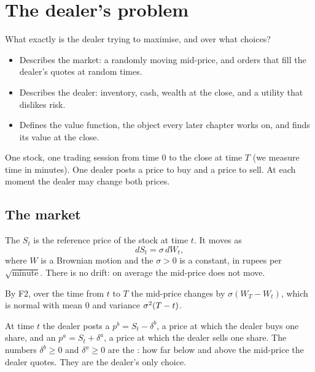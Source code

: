 \chapter{The dealer's problem}
\label{ch:problem}

\begin{question}
What exactly is the dealer trying to maximise, and over what choices?
\end{question}

\begin{whatfor}
\begin{itemize}
  \item Describes the market: a randomly moving mid-price, and orders that fill the dealer's quotes at random times.
  \item Describes the dealer: inventory, cash, wealth at the close, and a utility that dislikes risk.
  \item Defines the value function, the object every later chapter works on, and finds its value at the close.
\end{itemize}
\end{whatfor}

\begin{setup}[Setup]
One stock, one trading session from time $0$ to the close at time $T$ (we measure time in minutes). One dealer posts a price to buy and a price to sell. At each moment the dealer may change both prices.
\end{setup}

\section{The market}

\begin{definition}
\label{def:mid}
The  $S_t$ is the reference price of the stock at time $t$. It moves as
\[
  dS_t=\sigma\,dW_t ,
\]
where $W$ is a Brownian motion and the  $\sigma>0$ is a constant, in rupees per $\sqrt{\text{minute}}$. There is no drift: on average the mid-price does not move.
\end{definition}

By F2, over the time from $t$ to $T$ the mid-price changes by $\sigma(W_T-W_t)$, which is normal with mean $0$ and variance $\sigma^2(T-t)$.

\begin{definition}[Quotes]
\label{def:quotes}
At time $t$ the dealer posts a  $p^b=S_t-\delta^b$, a price at which the dealer buys one share, and an  $p^a=S_t+\delta^a$, a price at which the dealer sells one share. The numbers $\delta^b\ge0$ and $\delta^a\ge0$ are the : how far below and above the mid-price the dealer quotes. They are the dealer's only choice.
\end{definition}

